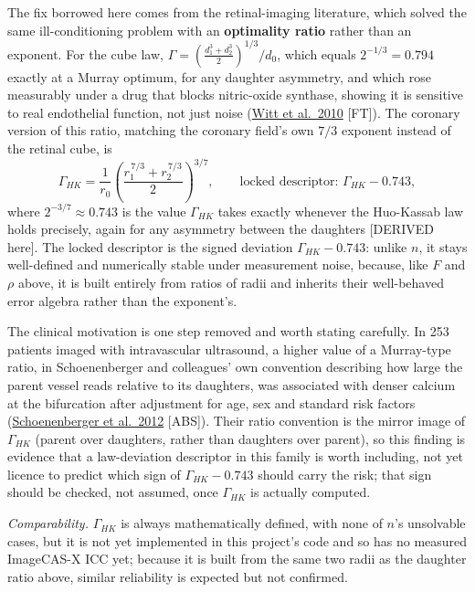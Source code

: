 \documentclass[11pt]{article}
\begin{document}
The fix borrowed here comes from the retinal-imaging literature, which solved the same
ill-conditioning problem with an \textbf{optimality ratio} rather than an exponent. For the cube law,
$\Gamma = \left(\tfrac{d_1^3+d_2^3}{2}\right)^{1/3}/d_0$, which equals $2^{-1/3}=0.794$ exactly at a
Murray optimum, for any daughter asymmetry, and which rose measurably under a drug that blocks
nitric-oxide synthase, showing it is sensitive to real endothelial function, not just noise
(\href{https://pmc.ncbi.nlm.nih.gov/articles/PMC2954284/}{Witt et al.\ 2010} [FT]). The coronary
version of this ratio, matching the coronary field's own $7/3$ exponent instead of the retinal cube,
is
\begin{equation}
  \Gamma_{HK} = \frac{1}{r_0}\left(\frac{r_1^{\,7/3} + r_2^{\,7/3}}{2}\right)^{3/7} ,
  \qquad\text{locked descriptor: } \Gamma_{HK} - 0.743 ,
  \label{eq:gamma-hk}
\end{equation}
where $2^{-3/7}\approx0.743$ is the value $\Gamma_{HK}$ takes exactly whenever the Huo-Kassab law
holds precisely, again for any asymmetry between the daughters [DERIVED here]. The locked descriptor
is the signed deviation $\Gamma_{HK}-0.743$: unlike $n$, it stays well-defined and numerically stable
under measurement noise, because, like $F$ and $\rho$ above, it is built entirely from ratios of
radii and inherits their well-behaved error algebra rather than the exponent's.

The clinical motivation is one step removed and worth stating carefully. In 253 patients imaged with
intravascular ultrasound, a higher value of a Murray-type ratio, in Schoenenberger and colleagues'
own convention describing how large the parent vessel reads relative to its daughters, was
associated with denser calcium at the bifurcation after adjustment for age, sex and standard risk
factors (\href{https://pubmed.ncbi.nlm.nih.gov/22261173/}{Schoenenberger et al.\ 2012} [ABS]). Their
ratio convention is the mirror image of $\Gamma_{HK}$ (parent over daughters, rather than daughters
over parent), so this finding is evidence that a law-deviation descriptor in this family is worth
including, not yet licence to predict which sign of $\Gamma_{HK}-0.743$ should carry the risk; that
sign should be checked, not assumed, once $\Gamma_{HK}$ is actually computed.

\emph{Comparability.} $\Gamma_{HK}$ is always mathematically defined, with none of $n$'s unsolvable
cases, but it is not yet implemented in this project's code and so has no measured ImageCAS-X ICC
yet; because it is built from the same two radii as the daughter ratio above, similar reliability is
expected but not confirmed.
\end{document}
